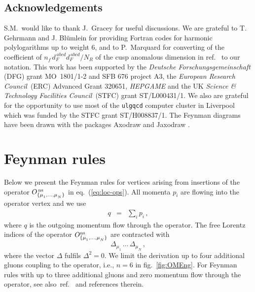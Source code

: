 \documentclass[12pt]{article}
\renewcommand{\theequation}{\thesection.\arabic{equation}}
\def\nf{{n^{}_{\! f}}}
\begin{document}
\subsection*{Acknowledgements}
%
S.M.~would like to thank J.~Gracey for useful discussions. We are grateful
to T. Gehrmann and J. Bl\"umlein for providing {\sc Fortran} codes for 
harmonic polylogarithms up to weight 6, and to P.~Marquard for converting of 
the coefficient of $\nf\,d_F^{\,abcd}d_F^{\,abcd}/N_R$ of the cusp anomalous 
dimension in ref.~\cite{Grozin:2015kna} to our notation.
%
This work has been supported by the {\it Deutsche Forschungsgemeinschaft} 
(DFG) grant MO~1801/1-2 and SFB 676 project A3, 
the {\it European Research Council}$\,$ (ERC) Advanced Grant 320651, 
{\it HEPGAME} 
and the UK {\it Science \& Technology Facilities Council}$\,$ (STFC) grant 
ST/L000431/1. 
We also are grateful for the opportunity to use most of the {\tt ulgqcd} 
computer cluster in Liverpool which was funded by the STFC grant ST/H008837/1.
%
The Feynman diagrams have been drawn with the packages {\sc Axodraw} 
\cite{Vermaseren:1994je} and {\sc Jaxo\-draw} \cite{Binosi:2003yf}.

\bigskip

\appendix
%
%
\renewcommand{\theequation}{\ref{sec:appA}.\arabic{equation}}
\setcounter{equation}{0}
\renewcommand{\thefigure}{\ref{sec:appA}.\arabic{figure}}
\setcounter{figure}{0}
\renewcommand{\thetable}{\ref{sec:appA}.\arabic{table}}
\setcounter{table}{0}
\section{Feynman rules}
\label{sec:appA}
%
Below we present the Feynman rules for vertices arising from insertions of 
the operator $O^{\,\rm ns}_{\{\mu^{\,}_1,...,\mu^{\,}_N\}}$
in eq.~(\ref{eq:loc-ops}). 
All momenta $p_i^{}$ are flowing into the operator vertex and we use
%
\begin{eqnarray}
q &=& \sum\limits_i p_i\, ,
\end{eqnarray}
%
where $q$ is the outgoing momentum flow through the operator. 
The free Lorentz indices of the operator 
$O^{\rm ns}_{\{\mu^{\,}_1,...,\mu^{\,}_N\}}$ are contracted with 
%
$$
\Delta_{\mu_1}\, \dots \,\Delta_{\mu_N}\, ,
$$
%
where the vector $\Delta$ fulfils $\Delta^2 = 0$.
We limit the derivation up to four additional gluons coupling to the operator, 
i.e., $n=6$ in fig.~\ref{fig:OMEng}. 
For Feynman rules with up to three additional gluons and zero momentum flow
through the operator, see also~ref.~\cite{Bierenbaum:2009mv} and references 
therein.
\end{document}
